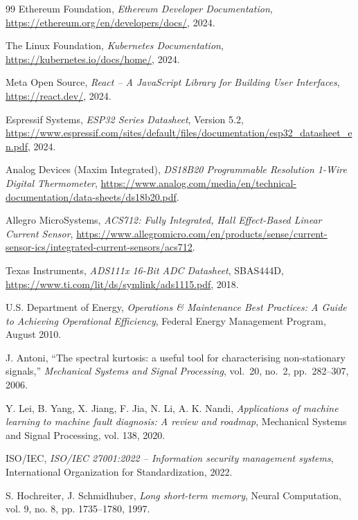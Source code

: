 \documentclass[12pt, a4paper, oneside]{report}
\begin{document}
\begin{thebibliography}{99}
  Ethereum Foundation,
  \textit{Ethereum Developer Documentation},
  \url{https://ethereum.org/en/developers/docs/}, 2024.

  The Linux Foundation,
  \textit{Kubernetes Documentation},
  \url{https://kubernetes.io/docs/home/}, 2024.

  Meta Open Source,
  \textit{React -- A JavaScript Library for Building User Interfaces},
  \url{https://react.dev/}, 2024.

  Espressif Systems,
  \textit{ESP32 Series Datasheet}, Version 5.2,
  \url{https://www.espressif.com/sites/default/files/documentation/esp32_datasheet_en.pdf}, 2024.

  Analog Devices (Maxim Integrated),
  \textit{DS18B20 Programmable Resolution 1-Wire Digital Thermometer},
  \url{https://www.analog.com/media/en/technical-documentation/data-sheets/ds18b20.pdf}.

  Allegro MicroSystems,
  \textit{ACS712: Fully Integrated, Hall Effect-Based Linear Current Sensor},
  \url{https://www.allegromicro.com/en/products/sense/current-sensor-ics/integrated-current-sensors/acs712}.

  Texas Instruments,
  \textit{ADS111x 16-Bit ADC Datasheet}, SBAS444D,
  \url{https://www.ti.com/lit/ds/symlink/ads1115.pdf}, 2018.

  U.S. Department of Energy,
  \textit{Operations \& Maintenance Best Practices: A Guide to Achieving Operational Efficiency},
  Federal Energy Management Program, August 2010.

  J. Antoni,
  ``The spectral kurtosis: a useful tool for characterising non-stationary signals,''
  \textit{Mechanical Systems and Signal Processing},
  vol.~20, no.~2, pp.~282--307, 2006.

  Y. Lei, B. Yang, X. Jiang, F. Jia, N. Li, A. K. Nandi,
  \textit{Applications of machine learning to machine fault diagnosis: A review and roadmap},
  Mechanical Systems and Signal Processing, vol. 138, 2020.

  ISO/IEC,
  \textit{ISO/IEC 27001:2022 -- Information security management systems},
  International Organization for Standardization, 2022.

  S. Hochreiter, J. Schmidhuber,
  \textit{Long short-term memory},
  Neural Computation, vol. 9, no. 8, pp. 1735--1780, 1997.

\end{thebibliography}
\end{document}
